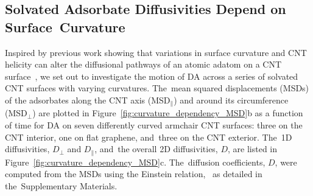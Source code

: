 \documentclass[molecules,article,accept,pdftex,moreauthors]{Definitions/mdpi}
\begin{document}
\subsection{Solvated Adsorbate Diffusivities Depend on Surface~Curvature}



Inspired by previous work showing that variations in surface curvature and CNT helicity can alter the diffusional pathways of an atomic adatom on a CNT surface~\cite{Shu2001}, we set out to investigate the motion of DA across a series of solvated CNT surfaces with varying curvatures. The~mean squared displacements (MSDs) of the adsorbates along the CNT axis (MSD$_\parallel$) and around its circumference (MSD$_\perp$) are plotted in Figure~\ref{fig:curvature_dependency_MSD}b as a function of time for DA on seven differently curved armchair CNT surfaces: three on the CNT interior, one on flat graphene, and~three on the CNT exterior. The~1D diffusivities, $D_\perp$ and $D_\parallel$, and~the overall 2D diffusivities, $D$, are listed in Figure~\ref{fig:curvature_dependency_MSD}c. The~diffusion coefficients, $D$, were computed from the MSDs using the Einstein relation,~\cite{Alexiadis2008, ums} as detailed in the~Supplementary Materials. %
\end{document}
